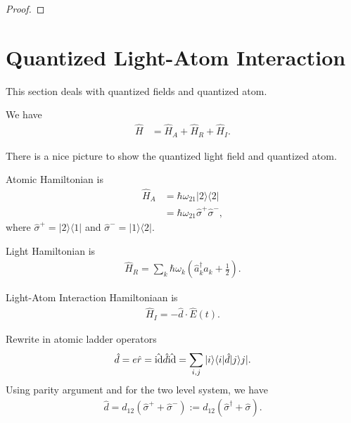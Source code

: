 \documentclass[../../note.tex]{subfiles}
\begin{document}
\begin{proof}
\end{proof}


\section{Quantized Light-Atom Interaction}
This section deals with quantized fields and quantized atom.

We have 
\begin{align}
    \hat{H}
    &= \hat{H}_A + \hat{H}_R + \hat{H}_I.
\end{align}

There is a nice picture to show the quantized light field and quantized atom.

Atomic Hamiltonian is 
\begin{align}
    \hat{H}_A
    &= \hbar \omega_{21} \vert 2 \rangle \langle 2 \vert \\
    &= \hbar \omega_{21} \hat{\sigma}^{+} \hat{\sigma}^{-},
\end{align}
where $\hat{\sigma}^{+} = \vert 2 \rangle \langle 1 \vert$ and $\hat{\sigma}^{-} = \vert 1 \rangle \langle 2 \vert$.

Light Hamiltonian is 
\begin{align}
    \hat{H}_R = \sum_{k} \hbar \omega_{k} (\hat{a}^{\dagger}_k \hat{a}_k + \frac{1}{2}).
\end{align}

Light-Atom Interaction Hamiltoniaan is 
\begin{align}
    \hat{H}_I = - \hat{d} \cdot \hat{E}(t).
\end{align}

Rewrite in atomic ladder operators 
\begin{align}
    \hat{d} = e \hat{r} = \hat{\operatorname{id}} \hat{d} \hat{\operatorname{id}} = \sum_{i,j} \vert i \rangle \langle i \vert \hat{d} \vert j \rangle j \vert.
\end{align}
Using parity argument and for the two level system, we have
\begin{align}
    \hat{d} = d_{12} (\hat{\sigma}^{+} + \hat{\sigma}^{-}):= d_{12} (\hat{\sigma}^{\dagger} + \hat{\sigma}).
\end{align}
\end{document}
